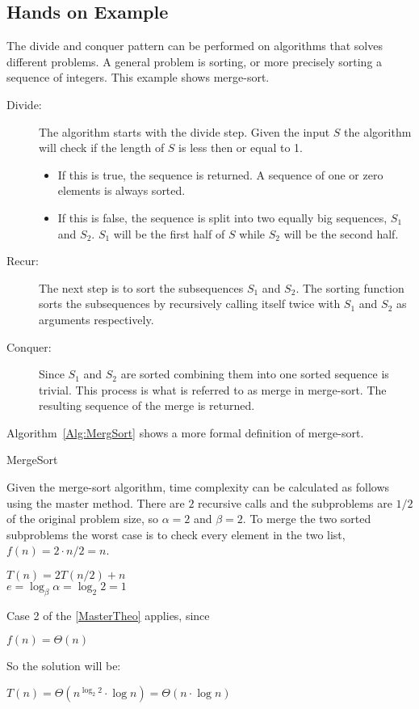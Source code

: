 \subsection{Hands on Example}
The divide and conquer pattern can be performed on algorithms that solves
different problems. A general problem is sorting, or more precisely sorting a
sequence of integers. This example shows merge-sort.

\begin{description}
\item[Divide:] The algorithm starts with the divide step. Given the input $S$
the algorithm will check if the length of $S$ is less then or equal to 1.
\begin{itemize}
\item If this is true, the sequence is returned. A sequence of one or zero
elements is always sorted.
\item If this is false, the sequence is split into two equally big sequences,
$S_1$ and $S_2$. $S_1$ will be the first half of $S$ while $S_2$ will be the
second half.
\end{itemize}
\item[Recur:] The next step is to sort the subsequences $S_1$ and $S_2$. The
sorting function sorts the subsequences by recursively calling itself twice with
$S_1$ and $S_2$ as arguments respectively.
\item[Conquer:] Since $S_1$ and $S_2$ are sorted combining them into one sorted
sequence is trivial. This process is what is referred to as merge in merge-sort.
The resulting sequence of the merge is returned.
\end{description}
Algorithm~\ref{Alg:MergSort} shows a more formal definition of merge-sort.

\begin{algorithm}
\DontPrintSemicolon
{}
\caption{MergeSort}
\label{Alg:MergSort}
\end{algorithm}

Given the merge-sort algorithm, time complexity can be calculated as follows
using the master method. There are $2$ recursive calls and the subproblems are
$1/2$ of the original problem size, so $\alpha=2$ and $\beta=2$. To merge the
two sorted subproblems the worst case is to check every element in the two list,
$f(n) = 2 \cdot n/2 = n$.
\begin{center}
$T(n) = 2T(n/2) + n$\\
$e=\log_\beta\alpha=\log_2 2=1$
\end{center}
\newpage
Case 2 of the \cref{MasterTheo} applies, since
\begin{center}
$f(n) = \Theta(n)$
\end{center}
So the solution will be:
\begin{center}
$T(n) = \Theta(n^{\log_2 2} \cdot \log n) = \Theta(n \cdot \log n)$
\end{center}

